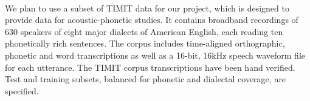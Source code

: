 \documentclass[a4paper,11pt]{article}
\theoremstyle{mytheor}
\begin{document}
\paragraph{}
We plan to use a subset of TIMIT data for our project, which is designed to provide data for acoustic-phonetic studies. It contains broadband recordings of 630 speakers of eight major dialects of American English, each reading ten phonetically rich sentences. The corpus includes time-aligned orthographic, phonetic and word transcriptions as well as a 16-bit, 16kHz speech waveform file for each utterance. The TIMIT corpus transcriptions have been hand verified. Test and training subsets, balanced for phonetic and dialectal coverage, are specified.
\end{document}
